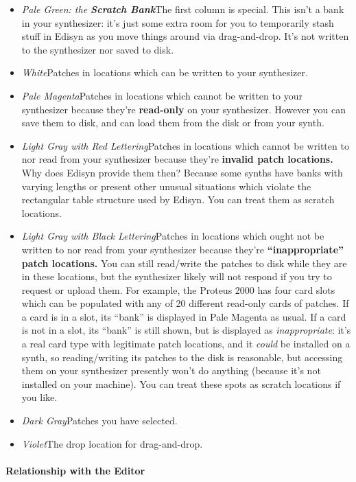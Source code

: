 \documentclass{article}
\begin{document}
\begin{itemize}
\item {\it Pale Green: the \textbf{Scratch Bank}}\quad The first column is special.  This isn't a bank in your synthesizer: it's just some extra room for you to temporarily stash stuff in Edisyn as you move things around via drag-and-drop.  It's not written to the synthesizer nor saved to disk.
\item {\it White}\quad Patches in locations which can be written to your synthesizer.
\item {\it Pale Magenta}\quad Patches in locations which cannot be written to your synthesizer because they're {\bf read-only} on your synthesizer.  However you can save them to disk, and can load them from the disk or from your synth.
\item {\it Light Gray with Red Lettering}\quad Patches in locations which cannot be written to nor read from your synthesizer because they're {\bf invalid patch locations.}  Why does Edisyn provide them then?  Because some synths have banks with varying lengths or present other unusual situations which violate the rectangular table structure used by Edisyn.  You can treat them as scratch locations.
\item {\it Light Gray with Black Lettering}\quad Patches in locations which ought not be written to nor read from your synthesizer because they're {\bf ``inappropriate'' patch locations.}  You can still read/write the patches to disk while they are in these locations, but the synthesizer likely will not respond if you try to request or upload them.  For example, the Proteus 2000 has four card slots which can be populated with any of 20 different read-only cards of patches.  If a card is in a slot, its ``bank'' is displayed in Pale Magenta as usual.  If a card is not in a slot, its ``bank'' is still shown, but is displayed as {\it inappropriate}: it's a real card type with legitimate patch locations, and it {\it could} be installed on a synth, so reading/writing its patches to the disk is reasonable, but accessing them on your synthesizer presently won't do anything (because it's not installed on your machine).  You can treat these spots as scratch locations if you like.
\item {\it Dark Gray}\quad Patches you have selected.
\item {\it Violet}\quad The drop location for drag-and-drop.
\end{itemize}

\paragraph{Relationship with the Editor} 
\end{document}
